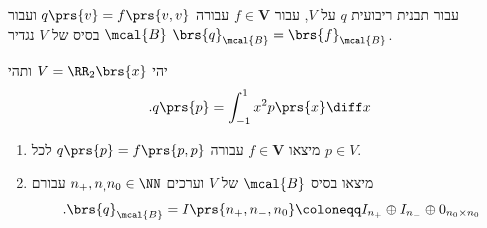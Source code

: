 \documentclass[a4paper,10pt,twoside,openany]{book}
\begin{document}
\begin{exercisechap}
עבור תבנית ריבועית
$q$
על
$V$,
עבור
$f \in \mathbf{V}$
עבורה
$q\prs{v} = f\prs{v,v}$
ועבור
$\mcal{B}$
בסיס של
$V$
נגדיר
$\brs{q}_{\mcal{B}} = \brs{f}_{\mcal{B}}$.

יהי
$V = \RR_2\brs{x}$
ותהי
\begin{align*}
\text{.} q\prs{p} = \int_{-1}^1 x^2 p\prs{x} \diff x
\end{align*}

\begin{enumerate}
\item מיצאו
$f \in \mathbf{V}$
עבורה
$q\prs{p} = f\prs{p,p}$
לכל
$p \in V$.

\item מיצאו בסיס
$\mcal{B}$
של
$V$
וערכים
$n_+, n_, n_0 \in \NN$
עבורם
\[\text{.} \brs{q}_{\mcal{B}} = I\prs{n_+, n_-, n_0} \coloneqq I_{n_+} \oplus I_{n_-} \oplus 0_{n_0 \times n_0}\]
\end{enumerate}
\end{exercisechap}
\end{document}
